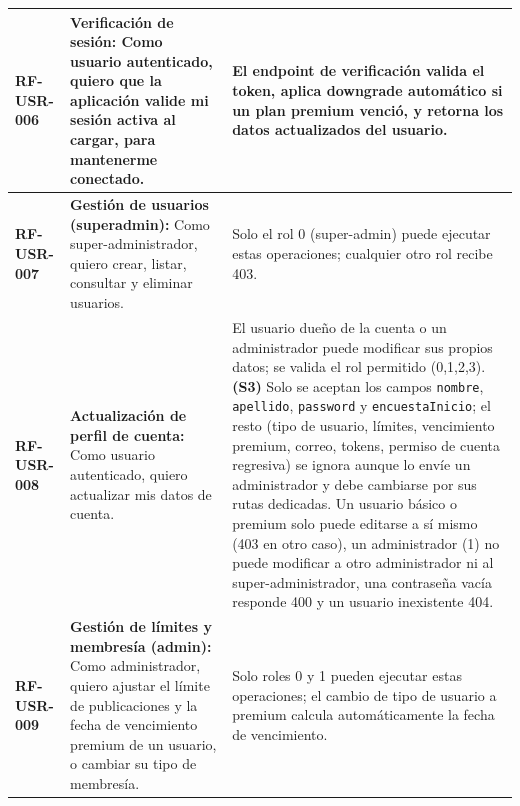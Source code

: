 \begin{longtable}{|l||p{7cm}|p{4.5cm}|}
\hline
\textbf{RF-USR-006} & \textbf{Verificación de sesión:} Como usuario autenticado, quiero que la aplicación valide mi sesión activa al cargar, para mantenerme conectado. & El endpoint de verificación valida el token, aplica downgrade automático si un plan premium venció, y retorna los datos actualizados del usuario. \\
\hline
\textbf{RF-USR-007} & \textbf{Gestión de usuarios (superadmin):} Como super-administrador, quiero crear, listar, consultar y eliminar usuarios. & Solo el rol 0 (super-admin) puede ejecutar estas operaciones; cualquier otro rol recibe 403. \\
\hline
\textbf{RF-USR-008} & \textbf{Actualización de perfil de cuenta:} Como usuario autenticado, quiero actualizar mis datos de cuenta. & El usuario dueño de la cuenta o un administrador puede modificar sus propios datos; se valida el rol permitido (0,1,2,3). \textbf{(S3)} Solo se aceptan los campos \texttt{nombre}, \texttt{apellido}, \texttt{password} y \texttt{encuestaInicio}; el resto (tipo de usuario, límites, vencimiento premium, correo, tokens, permiso de cuenta regresiva) se ignora aunque lo envíe un administrador y debe cambiarse por sus rutas dedicadas. Un usuario básico o premium solo puede editarse a sí mismo (403 en otro caso), un administrador (1) no puede modificar a otro administrador ni al super-administrador, una contraseña vacía responde 400 y un usuario inexistente 404. \\
\hline
\textbf{RF-USR-009} & \textbf{Gestión de límites y membresía (admin):} Como administrador, quiero ajustar el límite de publicaciones y la fecha de vencimiento premium de un usuario, o cambiar su tipo de membresía. & Solo roles 0 y 1 pueden ejecutar estas operaciones; el cambio de tipo de usuario a premium calcula automáticamente la fecha de vencimiento. \\
\hline
\end{longtable}

